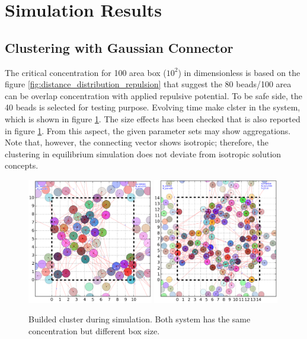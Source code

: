 \documentclass[10pt, a4paper]{report}
\begin{document}
\section{Simulation Results}
\subsection{Clustering with Gaussian Connector}
The critical concentration for 100 area box ($10^2$) in dimensionless is based on the figure \ref{fig:distance_distribution_repulsion} that suggest the 80 beads/100 area can be overlap concentration with applied repulsive potential. To be safe side, the 40 beads is selected for testing purpose. Evolving time make clster in the system, which is shown in figure \ref{fig:clustering}. The size effects has been checked that is also reported in figure \ref{fig:clustering}. From this aspect, the given parameter sets may show aggregations. Note that, however, the connecting vector shows isotropic; therefore, the clustering in equilibrium simulation does not deviate from isotropic solution concepts. 

\begin{figure}
  \centering
  \includegraphics[width=0.49\textwidth]{figures/NP40_A100_clustering.png}
  \includegraphics[width=0.49\textwidth]{figures/NP80_A200_clustering.png}
  \caption{Builded cluster during simulation. Both system has the same concentration but different box size.}
  \label{fig:clustering}
\end{figure}
\end{document}

